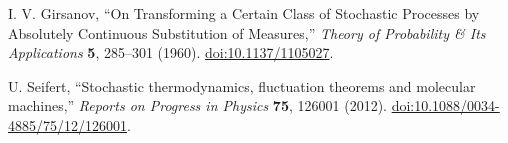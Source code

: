 I. V. Girsanov,
``On Transforming a Certain Class of Stochastic Processes by Absolutely
Continuous Substitution of Measures,''
\emph{Theory of Probability \& Its Applications} \textbf{5}, 285--301 (1960).
\href{https://doi.org/10.1137/1105027}{doi:10.1137/1105027}.

U. Seifert,
``Stochastic thermodynamics, fluctuation theorems and molecular machines,''
\emph{Reports on Progress in Physics} \textbf{75}, 126001 (2012).
\href{https://doi.org/10.1088/0034-4885/75/12/126001}{doi:10.1088/0034-4885/75/12/126001}.
